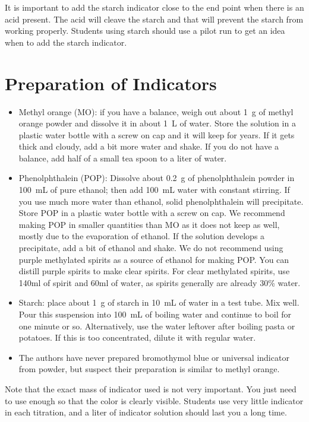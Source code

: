 It is important to add the starch indicator close to the end point when there is an acid present. The acid will cleave the starch and that will prevent the starch from working properly. Students using starch should use a pilot run to get an idea when to add the starch indicator.

\section{Preparation of Indicators}
\begin{itemize}

\item{Methyl orange (MO): if you have a balance, weigh out about 1~g of methyl orange powder and dissolve it in about 1~L of water. Store the solution in a 
plastic water bottle with a screw on cap and it will keep for years. If it gets thick and cloudy, add a bit more water and shake. If you do not have a balance, add half of a small tea spoon to a liter of water.}

\item{Phenolphthalein (POP): Dissolve about 0.2~g of phenolphthalein powder in 100~mL of pure ethanol; then add 100~mL water with constant stirring. If you use 
much more water than ethanol, solid phenolphthalein will precipitate. Store POP in a plastic water bottle with a screw on cap. We recommend making POP in smaller quantities than MO as it does not keep as well, mostly due to the evaporation of ethanol. If the solution develops a precipitate, add a bit of ethanol and shake. We do not recommend using purple methylated spirits as a source of ethanol for making POP. You can distill purple spirits to make clear spirits. For clear methylated spirits, use 140ml of spirit and 60ml of water, as spirits generally are already 30\% water.}

\item{Starch: place about 1~g of starch in 10~mL of water in a test tube. Mix well. Pour this suspension into 100~mL of boiling water and continue to boil for 
one minute or so. Alternatively, use the water leftover after boiling pasta or potatoes. If this is too concentrated, dilute it with regular water.}

\item{The authors have never prepared bromothymol blue or universal indicator from powder, but suspect their preparation is similar to methyl orange.}

\end{itemize}

Note that the exact mass of indicator used is not very important. You just need to use enough so that the color is clearly visible. Students use very little indicator in each titration, and a liter of indicator solution should last you a long time.
